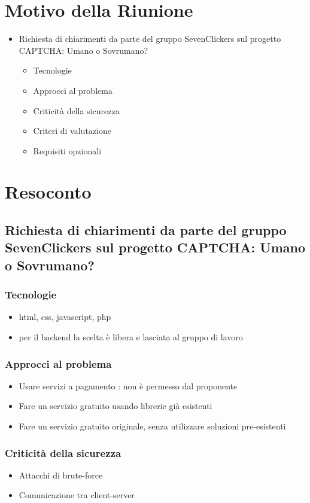 \section{Motivo della Riunione}
\begin{itemize}
    \item Richiesta di chiarimenti da parte del gruppo SevenClickers sul progetto CAPTCHA: Umano o Sovrumano?
    \begin{itemize}
        \item Tecnologie
        \item Approcci al problema
        \item Criticità della sicurezza
        \item Criteri di valutazione
        \item Requisiti opzionali
    \end{itemize}
\end{itemize}
\section{Resoconto}
\subsection{Richiesta di chiarimenti da parte del gruppo SevenClickers sul progetto CAPTCHA: Umano o Sovrumano?}
\subsubsection{Tecnologie}
\begin{itemize}
    \item html, css, javascript, php
    \item per il backend la scelta è libera e lasciata al gruppo di lavoro
\end{itemize}
\subsubsection{Approcci al problema}
\begin{itemize}
    \item Usare servizi a pagamento : non è permesso dal proponente
    \item Fare un servizio gratuito usando librerie già esistenti
    \item Fare un servizio gratuito originale, senza utilizzare soluzioni pre-esistenti
\end{itemize}
\subsubsection{Criticità della sicurezza}
\begin{itemize}
    \item Attacchi di brute-force
    \item Comunicazione tra client-server
\end{itemize}
